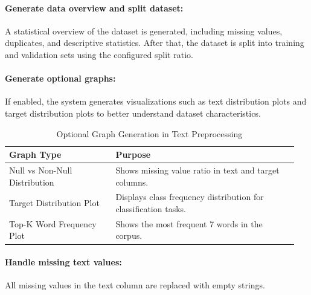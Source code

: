 \paragraph{Generate data overview and split dataset:}\par
A statistical overview of the dataset is generated, including missing values, duplicates, and descriptive statistics. After that, the dataset is split into training and validation sets using the configured split ratio.
\vspace{1cm}
\paragraph{Generate optional graphs:}\par
If enabled, the system generates visualizations such as text distribution plots and target distribution plots to better understand dataset characteristics.
\vspace{0.5cm}

\begin{table}[!htbp]
\centering
\small
\renewcommand{\arraystretch}{1.15}
\setlength{\tabcolsep}{4pt}
\caption{Optional Graph Generation in Text Preprocessing}
\begin{tabular}{p{0.35\linewidth}p{0.60\linewidth}}
\toprule
\textbf{Graph Type} & \textbf{Purpose} \\
\midrule

Null vs Non-Null Distribution &
Shows missing value ratio in text and target columns. \\

Target Distribution Plot &
Displays class frequency distribution for classification tasks. \\

Top-K Word Frequency Plot &
Shows the most frequent 7 words in the corpus.\\

\bottomrule
\end{tabular}
\end{table}
\vspace{1cm}
\paragraph{Handle missing text values:}\par
All missing values in the text column are replaced with empty strings.
\vspace{1cm}
